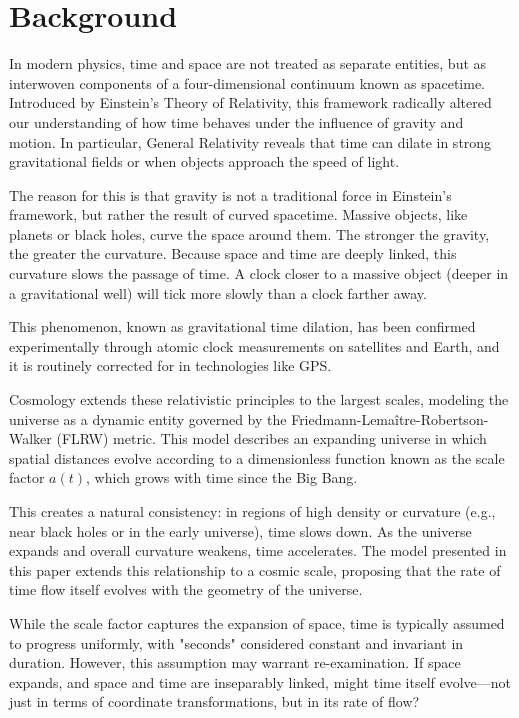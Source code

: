 \documentclass[12pt]{article}
\begin{document}
\section{Background}
In modern physics, time and space are not treated as separate entities, but as interwoven components of a four-dimensional continuum known as spacetime. Introduced by Einstein’s Theory of Relativity, this framework radically altered our understanding of how time behaves under the influence of gravity and motion. In particular, General Relativity reveals that time can dilate in strong gravitational fields or when objects approach the speed of light.

The reason for this is that gravity is not a traditional force in Einstein's framework, but rather the result of curved spacetime. Massive objects, like planets or black holes, curve the space around them. The stronger the gravity, the greater the curvature. Because space and time are deeply linked, this curvature slows the passage of time. A clock closer to a massive object (deeper in a gravitational well) will tick more slowly than a clock farther away.

This phenomenon, known as gravitational time dilation, has been confirmed experimentally through atomic clock measurements on satellites and Earth, and it is routinely corrected for in technologies like GPS.

Cosmology extends these relativistic principles to the largest scales, modeling the universe as a dynamic entity governed by the Friedmann-Lemaître-Robertson-Walker (FLRW) metric. This model describes an expanding universe in which spatial distances evolve according to a dimensionless function known as the scale factor $a(t)$, which grows with time since the Big Bang.

This creates a natural consistency: in regions of high density or curvature (e.g., near black holes or in the early universe), time slows down. As the universe expands and overall curvature weakens, time accelerates. The model presented in this paper extends this relationship to a cosmic scale, proposing that the rate of time flow itself evolves with the geometry of the universe.

While the scale factor captures the expansion of space, time is typically assumed to progress uniformly, with "seconds" considered constant and invariant in duration. However, this assumption may warrant re-examination. If space expands, and space and time are inseparably linked, might time itself evolve---not just in terms of coordinate transformations, but in its rate of flow?
\end{document}
